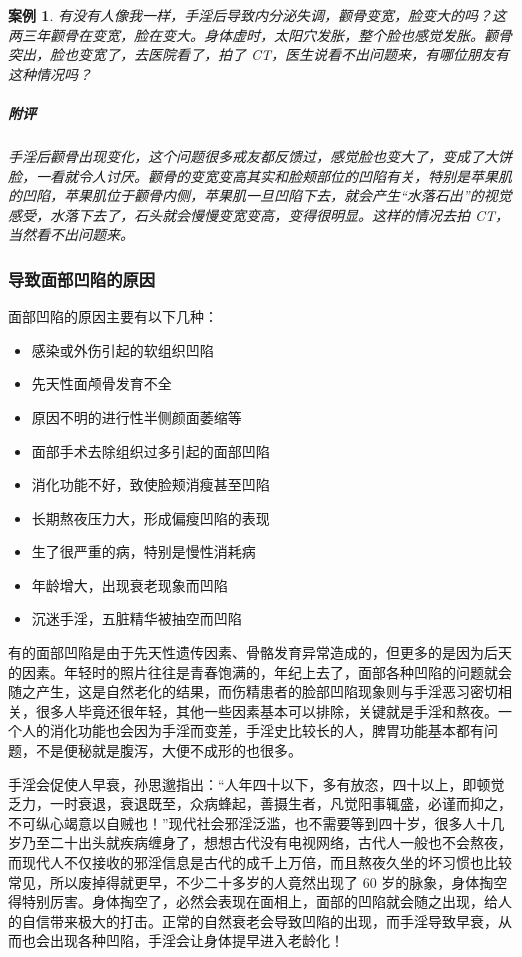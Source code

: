 \documentclass{ctexart}
\newtheorem{case}{案例}
\begin{document}
\begin{case}
    有没有人像我一样，手淫后导致内分泌失调，颧骨变宽，脸变大的吗？这两三年颧骨在变宽，脸在变大。身体虚时，太阳穴发胀，整个脸也感觉发胀。颧骨突出，脸也变宽了，去医院看了，拍了 CT，医生说看不出问题来，有哪位朋友有这种情况吗？
    \subparagraph{附评} 手淫后颧骨出现变化，这个问题很多戒友都反馈过，感觉脸也变大了，变成了大饼脸，一看就令人讨厌。颧骨的变宽变高其实和脸颊部位的凹陷有关，特别是苹果肌的凹陷，苹果肌位于颧骨内侧，苹果肌一旦凹陷下去，就会产生“水落石出”的视觉感受，水落下去了，石头就会慢慢变宽变高，变得很明显。这样的情况去拍 CT，当然看不出问题来。
\end{case}

\subsubsection{导致面部凹陷的原因}

面部凹陷的原因主要有以下几种：

\begin{multicols}{2}
    \begin{itemize}
        \item 感染或外伤引起的软组织凹陷
        \item 先天性面颅骨发育不全
        \item 原因不明的进行性半侧颜面萎缩等
        \item 面部手术去除组织过多引起的面部凹陷
        \item 消化功能不好，致使脸颊消瘦甚至凹陷
        \item 长期熬夜压力大，形成偏瘦凹陷的表现
        \item 生了很严重的病，特别是慢性消耗病
        \item 年龄增大，出现衰老现象而凹陷
        \item 沉迷手淫，五脏精华被抽空而凹陷
    \end{itemize}
\end{multicols}

有的面部凹陷是由于先天性遗传因素、骨骼发育异常造成的，但更多的是因为后天的因素。年轻时的照片往往是青春饱满的，年纪上去了，面部各种凹陷的问题就会随之产生，这是自然老化的结果，而伤精患者的脸部凹陷现象则与手淫恶习密切相关，很多人毕竟还很年轻，其他一些因素基本可以排除，关键就是手淫和熬夜。一个人的消化功能也会因为手淫而变差，手淫史比较长的人，脾胃功能基本都有问题，不是便秘就是腹泻，大便不成形的也很多。

手淫会促使人早衰，孙思邈指出：“人年四十以下，多有放恣，四十以上，即顿觉乏力，一时衰退，衰退既至，众病蜂起，善摄生者，凡觉阳事辄盛，必谨而抑之，不可纵心竭意以自贼也！”现代社会邪淫泛滥，也不需要等到四十岁，很多人十几岁乃至二十出头就疾病缠身了，想想古代没有电视网络，古代人一般也不会熬夜，而现代人不仅接收的邪淫信息是古代的成千上万倍，而且熬夜久坐的坏习惯也比较常见，所以废掉得就更早，不少二十多岁的人竟然出现了 60 岁的脉象，身体掏空得特别厉害。身体掏空了，必然会表现在面相上，面部的凹陷就会随之出现，给人的自信带来极大的打击。正常的自然衰老会导致凹陷的出现，而手淫导致早衰，从而也会出现各种凹陷，手淫会让身体提早进入老龄化！
\end{document}
